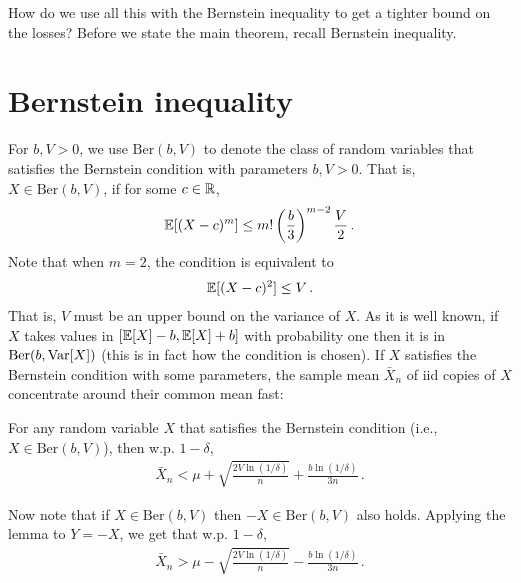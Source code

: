\documentclass[twoside]{article}
\begin{document}
How do we use all this with the Bernstein inequality to get a tighter bound on the losses?  Before we state the main theorem, recall Bernstein inequality.

\newcommand{\Ber}{\mathrm{Ber}}
\section{Bernstein inequality}
For $b,V>0$, we use $\Ber(b, V)$ to denote the class of random variables that satisfies the Bernstein condition with parameters $b,V>0$.
That is, $X\in \Ber(b,V)$, if for some $c\in \mathbb{R}$,
\begin{align}
\mathbb{E}[ (X-c)^m ] \le m! \left(\frac{b}{3}\right)^{m-2}  \frac{V}{2}\,.
\end{align}
Note that when $m=2$, the condition is equivalent to 
\begin{align}
\mathbb{E}[ (X-c)^2 ] \le V\,.
\end{align}
That is, $V$ must be an upper bound on the variance of $X$.
As it is well known, if $X$ takes values in $[\mathbb{E}[X]-b,\mathbb{E}[X]+b]$ with probability one then it is in $\Ber(b, \Var[X])$ (this is in fact how the condition is chosen).
If $X$ satisfies the Bernstein condition with some parameters, the sample mean $\bar X_n$ of iid copies of $X$ concentrate around their common mean fast:
\begin{lemma}
  For any random variable $X$ that satisfies the Bernstein condition (i.e., $X \in \Ber(b, V)$), then w.p. $1-\delta$, 
\begin{align}
    \bar X_n < \mu + \sqrt{\frac{2V \ln(1/\delta)}{n}} + \frac{b \ln(1/\delta)}{3n}\,.
\end{align}
\end{lemma}
Now note that if $X\in \Ber(b,V)$ then $-X\in \Ber(b,V)$ also holds. Applying the lemma to $Y = -X$, we get that w.p. $1-\delta$,
\begin{align}
    \bar X_n > \mu - \sqrt{\frac{2V \ln(1/\delta)}{n}} - \frac{b \ln(1/\delta)}{3n}\,.
\end{align}
\end{document}
